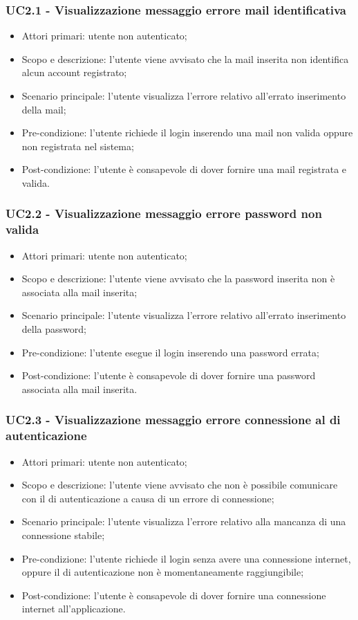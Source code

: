\subsubsection{UC2.1 - Visualizzazione messaggio errore mail identificativa}
\begin{itemize}
	\item  Attori primari: utente non autenticato;
	\item  Scopo e descrizione: l'utente viene avvisato che la mail inserita non identifica alcun account registrato;
	\item  Scenario principale: l'utente visualizza l'errore relativo all'errato inserimento della mail;
	\item  Pre-condizione: l'utente richiede il login inserendo una mail non valida oppure non registrata nel sistema;
	\item  Post-condizione: l'utente è consapevole di dover fornire una mail registrata e valida.
\end{itemize}
\subsubsection{UC2.2 - Visualizzazione messaggio errore password non valida}
\begin{itemize}
	\item  Attori primari: utente non autenticato;
	\item  Scopo e descrizione: l'utente viene avvisato che la password inserita non è associata alla mail inserita;
	\item  Scenario principale: l'utente visualizza l'errore relativo all'errato inserimento della password;
	\item  Pre-condizione: l'utente esegue il login inserendo una password errata;
	\item  Post-condizione: l'utente è consapevole di dover fornire una password associata alla mail inserita.
\end{itemize}
\subsubsection{UC2.3 - Visualizzazione messaggio errore connessione al  di autenticazione}
\begin{itemize}
	\item  Attori primari: utente non autenticato;
	\item  Scopo e descrizione: l'utente viene avvisato che non è possibile comunicare con il  di autenticazione a causa di un errore di connessione;
	\item  Scenario principale: l'utente visualizza l'errore relativo alla mancanza di una connessione stabile;
	\item  Pre-condizione: l'utente richiede il login senza avere una connessione internet, oppure il  di autenticazione non è momentaneamente raggiungibile;
	\item  Post-condizione: l'utente è consapevole di dover fornire una connessione internet all'applicazione.
\end{itemize}
